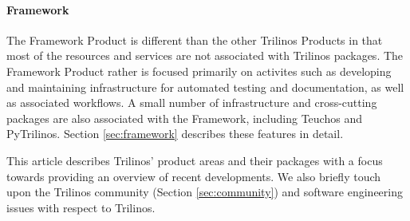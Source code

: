 \paragraph{Framework} The Framework Product is different than the other Trilinos Products in that most of the resources and services are not associated with Trilinos packages. The Framework Product rather is focused primarily on activites such as developing and maintaining infrastructure for automated testing and documentation, as well as associated workflows. A small number of infrastructure and cross-cutting packages are also associated with the Framework, including Teuchos and PyTrilinos. Section \ref{sec:framework} describes these features in detail.

This article describes Trilinos' product areas and their packages with a focus towards providing an overview of recent developments. We also briefly touch upon the Trilinos community (Section \ref{sec:community}) and software engineering issues with respect to Trilinos.

